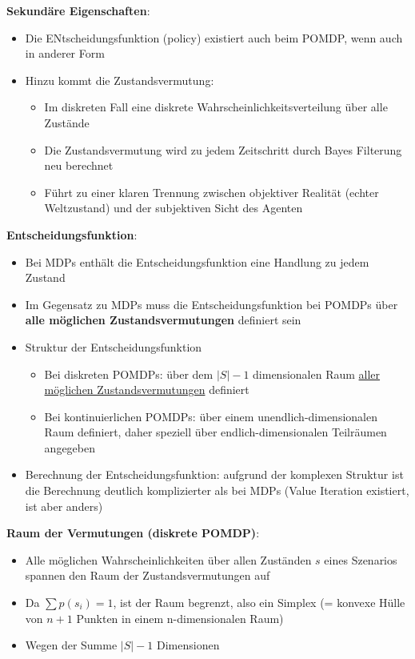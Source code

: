 \textbf{Sekund\"are Eigenschaften}:
\begin{itemize}
	\item Die ENtscheidungsfunktion (policy) existiert auch beim POMDP, wenn auch in anderer Form
	\item Hinzu kommt die Zustandsvermutung:
	\begin{itemize}
		\item Im diskreten Fall eine diskrete Wahrscheinlichkeitsverteilung \"uber alle Zust\"ande
		\item Die Zustandsvermutung wird zu jedem Zeitschritt durch Bayes Filterung neu berechnet
		\item F\"uhrt zu einer klaren Trennung zwischen objektiver Realit\"at (echter Weltzustand) und der subjektiven Sicht des Agenten
	\end{itemize}
\end{itemize}

\textbf{Entscheidungsfunktion}:
\begin{itemize}
	\item Bei MDPs enth\"alt die Entscheidungsfunktion eine Handlung zu jedem Zustand
	\item Im Gegensatz zu MDPs muss die Entscheidungsfunktion bei POMDPs \"uber \textbf{alle m\"oglichen Zustandsvermutungen} definiert sein
	\item Struktur der Entscheidungsfunktion
	\begin{itemize}
		\item Bei diskreten POMDPs: \"uber dem $|S|-1$ dimensionalen Raum \underline{aller m\"oglichen Zustandsvermutungen} definiert
		\item Bei kontinuierlichen POMDPs: \"uber einem unendlich-dimensionalen Raum definiert, daher speziell \"uber endlich-dimensionalen Teilr\"aumen angegeben
	\end{itemize}
	\item Berechnung der Entscheidungsfunktion: aufgrund der komplexen Struktur ist die Berechnung deutlich komplizierter als bei MDPs (Value Iteration existiert, ist aber anders)
\end{itemize}

\textbf{Raum der Vermutungen (diskrete POMDP)}:
\begin{itemize}
	\item Alle m\"oglichen Wahrscheinlichkeiten \"uber allen Zust\"anden $s$ eines Szenarios spannen den Raum der Zustandsvermutungen auf
	\item Da $\sum p(s_i) = 1$, ist der Raum begrenzt, also ein Simplex (= konvexe H\"ulle von $n+1$ Punkten in einem n-dimensionalen Raum)
	\item Wegen der Summe $|S|-1$ Dimensionen
\end{itemize}

